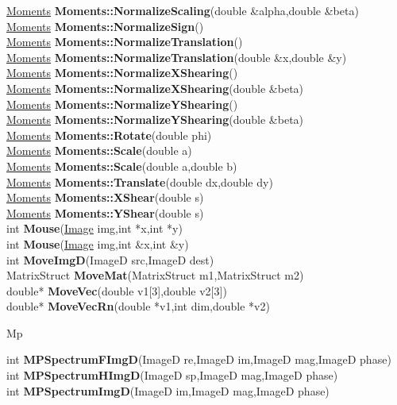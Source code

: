\documentclass[10pt,titlepage]{article}
\def\functionlistentry#1#2#3#4#5#6{\noindent #1 {\bf #2}(#3) \dotfill #6\\}
\def\letterref#1{}
\def\letterlabel#1{\vspace{0.5cm}\centerline{\Large #1}}
\def\letterlabelend#1{}
\begin{document}
{{\functionlistentry{\hyperlink{Moments}{Moments}}{Moments::NormalizeScaling}{double \&alpha,double \&beta}{833}{moments}{}
\functionlistentry{\hyperlink{Moments}{Moments}}{Moments::NormalizeSign}{}{824}{moments}{}
\functionlistentry{\hyperlink{Moments}{Moments}}{Moments::NormalizeTranslation}{}{825}{moments}{}
\functionlistentry{\hyperlink{Moments}{Moments}}{Moments::NormalizeTranslation}{double \&x,double \&y}{826}{moments}{}
\functionlistentry{\hyperlink{Moments}{Moments}}{Moments::NormalizeXShearing}{}{827}{moments}{}
\functionlistentry{\hyperlink{Moments}{Moments}}{Moments::NormalizeXShearing}{double \&beta}{828}{moments}{}
\functionlistentry{\hyperlink{Moments}{Moments}}{Moments::NormalizeYShearing}{}{829}{moments}{}
\functionlistentry{\hyperlink{Moments}{Moments}}{Moments::NormalizeYShearing}{double \&beta}{830}{moments}{}
\functionlistentry{\hyperlink{Moments}{Moments}}{Moments::Rotate}{double phi}{815}{moments}{}
\functionlistentry{\hyperlink{Moments}{Moments}}{Moments::Scale}{double a}{818}{moments}{}
\functionlistentry{\hyperlink{Moments}{Moments}}{Moments::Scale}{double a,double b}{819}{moments}{}
\functionlistentry{\hyperlink{Moments}{Moments}}{Moments::Translate}{double dx,double dy}{814}{moments}{}
\functionlistentry{\hyperlink{Moments}{Moments}}{Moments::XShear}{double s}{816}{moments}{}
\functionlistentry{\hyperlink{Moments}{Moments}}{Moments::YShear}{double s}{817}{moments}{}
\functionlistentry{int}{Mouse}{\hyperlink{Image}{Image} img,int *x,int *y}{100}{Visualisierung}{}
\functionlistentry{int}{Mouse}{\hyperlink{Image}{Image} img,int \&x,int \&y}{101}{Visualisierung}{}
\functionlistentry{int}{MoveImgD}{ImageD src,ImageD dest}{1097}{processing}{}
\functionlistentry{MatrixStruct}{MoveMat}{MatrixStruct m1,MatrixStruct m2}{1578}{obsolet}{}
\functionlistentry{double*}{MoveVec}{double v1[3],double v2[3]}{1556}{obsolet}{}
\functionlistentry{double*}{MoveVecRn}{double *v1,int dim,double *v2}{1566}{obsolet}{}

\letterlabel{Mp}
\letterref{A}
\letterref{B}
\letterref{C}
\letterref{D}
\letterref{E}
\letterref{F}
\letterref{G}
\letterref{H}
\letterref{I}
\letterref{K}
\letterref{L}
\letterref{M}
\letterref{N}
\letterref{O}
\letterref{P}
\letterref{Q}
\letterref{R}
\letterref{S}
\letterref{T}
\letterref{U}
\letterref{V}
\letterref{W}
\letterref{X}
\letterref{Y}
\letterref{Z}

\letterref{Ma}
\letterref{Me}
\letterref{Mi}
\letterref{Mk}
\letterref{Mo}
\letterref{Mp}
\letterref{Mu}
\letterlabelend{Mp}
\functionlistentry{int}{MPSpectrumFImgD}{ImageD re,ImageD im,ImageD mag,ImageD phase}{1205}{signalTrafo}{}
\functionlistentry{int}{MPSpectrumHImgD}{ImageD sp,ImageD mag,ImageD phase}{1206}{signalTrafo}{}
\functionlistentry{int}{MPSpectrumImgD}{ImageD im,ImageD mag,ImageD phase}{1207}{signalTrafo}{}

}}
\end{document}
